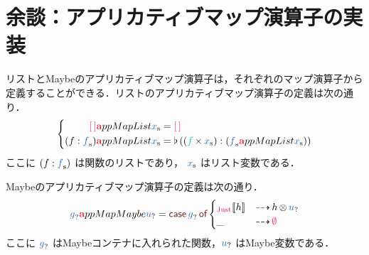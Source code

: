 \documentclass[a5paper,twoside,fleqn,draft]{jsbook}
\begin{document}
\section{余談：アプリカティブマップ演算子の実装}

リストとMaybeのアプリカティブマップ演算子は，それぞれのマップ演算子から定義することができる．リストのアプリカティブマップ演算子の定義は次の通り．
\begin{equation}
  \left\{
  \begin{aligned}
    {\hEmptyList}\hTypeName{a}ppMapList\hListVar{x}
    &={\hEmptyList}\\
    (f:\hListVar{f})\hTypeName{a}ppMapList\hListVar{x}
    &=\mJoinList{}((\hFunc{f}\hMap\hListVar{x}):(\hListVar{f}\hTypeName{a}ppMapList\hListVar{x}))
  \end{aligned}
  \right.
\end{equation}
ここに $(f:\hListVar{f})$ は関数のリストであり， $\hListVar{x}$ はリスト変数である．

Maybeのアプリカティブマップ演算子の定義は次の通り．
\begin{equation}
\label{eq:maybe-applicative-map-by-maybe-map}
\hMaybeVar{g}\hTypeName{a}ppMapMaybe\hMaybeVar{u}
=\hCaseSyntax{\hMaybeVar{g}}
\begin{cases}
\hJustWith{h}&\hIfSo h\hMaybeMap\hMaybeVar{u}\\
\_&\hIfSo\hNothing
\end{cases}
\end{equation}
ここに $\hMaybeVar{g}$ はMaybeコンテナに入れられた関数，$\hMaybeVar{u}$ はMaybe変数である．
\end{document}
